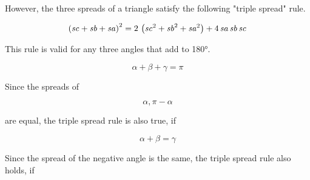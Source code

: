 \documentclass{article}
\begin{document}
\begin{eulernotebook}
\begin{eulercomment}
\begin{eulercomment}
\begin{eulercomment}
\begin{eulercomment}
\begin{eulercomment}
\begin{eulercomment}
\begin{eulercomment}
However, the three spreads of a triangle satisfy the following "triple spread" rule.
\end{eulercomment}
\begin{eulerformula}
\[
\left({\it sc}+{\it sb}+{\it sa}\right)^2=2\,\left({\it sc}^2+
 {\it sb}^2+{\it sa}^2\right)+4\,{\it sa}\,{\it sb}\,{\it sc}
\]
\end{eulerformula}
\begin{eulercomment}
This rule is valid for any three angles that add to 180°.

\end{eulercomment}
\begin{eulerformula}
\[
\alpha+\beta+\gamma=\pi
\]
\end{eulerformula}
\begin{eulercomment}
Since the spreads of

\end{eulercomment}
\begin{eulerformula}
\[
\alpha, \pi-\alpha
\]
\end{eulerformula}
\begin{eulercomment}
are equal, the triple spread rule is also true, if

\end{eulercomment}
\begin{eulerformula}
\[
\alpha+\beta=\gamma
\]
\end{eulerformula}
\begin{eulercomment}
Since the spread of the negative angle is the same, the triple spread
rule also holds, if


\end{eulercomment}
\end{eulercomment}
\end{eulercomment}
\end{eulercomment}
\end{eulercomment}
\end{eulercomment}
\end{eulercomment}
\end{eulernotebook}
\end{document}
